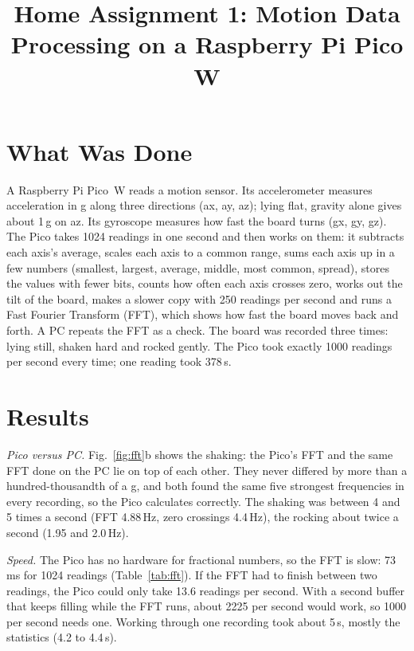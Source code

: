 \documentclass[conference]{IEEEtran}
\begin{document}
\title{Home Assignment 1: Motion Data Processing on a Raspberry Pi Pico W}

\author{
}

\maketitle

\section{What Was Done}
A Raspberry Pi Pico~W reads a motion sensor. Its accelerometer measures acceleration in g along three
directions (ax, ay, az); lying flat, gravity alone gives about 1\,g on az. Its gyroscope measures how
fast the board turns (gx, gy, gz). The Pico takes 1024 readings in one second and then works on them:
it subtracts each axis's average, scales each axis to a common range, sums each axis up in a few
numbers (smallest, largest, average, middle, most common, spread), stores the values with fewer bits,
counts how often each axis crosses zero, works out the tilt of the board, makes a slower copy with 250
readings per second and runs a Fast Fourier Transform (FFT), which shows how fast the board moves
back and forth. A PC repeats the FFT as a check. The board was recorded three
times: lying still, shaken hard and rocked gently. The Pico took exactly 1000 readings per second
every time; one reading took 378\,\textmu s.

\section{Results}
\textit{Pico versus PC.} Fig.~\ref{fig:fft}b shows the shaking: the Pico's FFT and the same FFT done on
the PC lie on top of each other. They never differed by more than a hundred-thousandth of a g, and both
found the same five strongest frequencies in every recording, so the Pico calculates correctly. The
shaking was between 4 and 5 times a second (FFT 4.88\,Hz, zero crossings 4.4\,Hz), the rocking about twice a second (1.95 and 2.0\,Hz).

\textit{Speed.} The Pico has no hardware for fractional numbers, so the FFT is slow: 73\,ms for 1024
readings (Table~\ref{tab:fft}). If the FFT had to finish between two readings, the Pico could only
take 13.6 readings per second. With a second buffer that keeps filling while the FFT runs, about 2225
per second would work, so 1000 per second needs one. Working through one recording took about 5\,s, mostly the statistics (4.2 to 4.4\,s).
\end{document}
